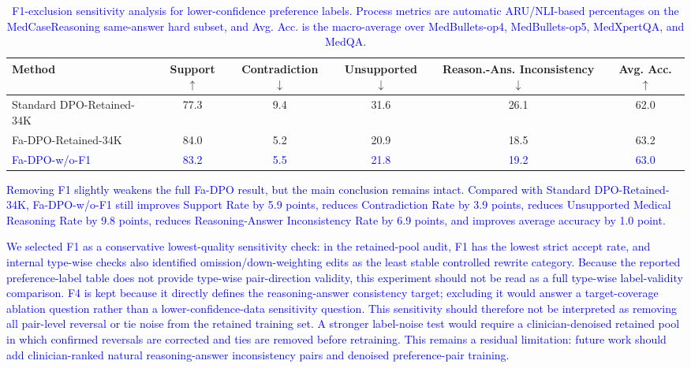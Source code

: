 \documentclass[12pt]{article}
\newcommand{\added}[1]{\textcolor{blue}{#1}}
\begin{document}
\begin{table}[htbp]
\centering
\small
\caption{\added{F1-exclusion sensitivity analysis for lower-confidence preference labels. Process metrics are automatic ARU/NLI-based percentages on the MedCaseReasoning same-answer hard subset, and Avg. Acc. is the macro-average over MedBullets-op4, MedBullets-op5, MedXpertQA, and MedQA.}}
\label{tab:response_r112_wo_f1_marked}
\begin{adjustbox}{max width=\textwidth}
\begin{tabular}{lccccc}
\toprule
\textbf{Method} & \textbf{Support $\uparrow$} & \textbf{Contradiction $\downarrow$} & \textbf{Unsupported $\downarrow$} & \textbf{Reason.-Ans. Inconsistency $\downarrow$} & \textbf{Avg. Acc. $\uparrow$} \\
\midrule
Standard DPO-Retained-34K & 77.3 & 9.4 & 31.6 & 26.1 & 62.0 \\
Fa-DPO-Retained-34K & 84.0 & 5.2 & 20.9 & 18.5 & 63.2 \\
\added{Fa-DPO-w/o-F1} & \added{83.2} & \added{5.5} & \added{21.8} & \added{19.2} & \added{63.0} \\
\bottomrule
\end{tabular}
\end{adjustbox}
\end{table}

\begin{displayquote}
\added{Removing F1 slightly weakens the full Fa-DPO result, but the main conclusion remains
intact. Compared with Standard DPO-Retained-34K, Fa-DPO-w/o-F1 still improves
Support Rate by 5.9 points, reduces Contradiction Rate by 3.9 points, reduces
Unsupported Medical Reasoning Rate by 9.8 points, reduces Reasoning-Answer Inconsistency
Rate by 6.9 points, and improves average accuracy by 1.0 point.}

\added{We selected F1 as a conservative lowest-quality sensitivity check: in the retained-pool audit, F1 has the lowest strict accept rate, and internal type-wise checks also identified omission/down-weighting edits as the least stable controlled rewrite category. Because the reported preference-label table does not provide type-wise pair-direction validity, this experiment should not be read as a full type-wise label-validity comparison. F4 is kept because it directly defines the reasoning-answer consistency target; excluding it would answer a target-coverage ablation question rather than a lower-confidence-data sensitivity question. This sensitivity should therefore not be interpreted as removing all pair-level reversal or tie noise from the retained training set. A stronger label-noise test would require a clinician-denoised retained pool in which confirmed reversals are corrected and ties are removed before retraining. This remains a residual limitation: future work should add clinician-ranked natural reasoning-answer inconsistency pairs and denoised preference-pair training.}
\end{displayquote}
\end{document}
